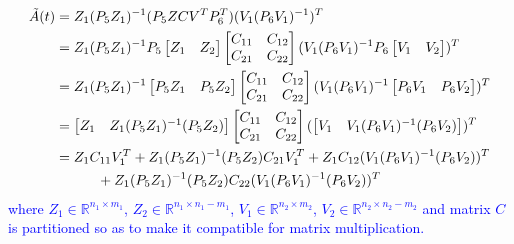 \documentclass{article}
\begin{document}
\textcolor{blue}{
\begin{equation}\label{eq41116}
\begin{split}
    \Tilde{A}(t)&=Z_1(P_5Z_1)^{-1}(P_5ZCV^TP_6^T)(V_1(P_6V_1)^{-1})^T\\
                &= Z_1(P_5Z_1)^{-1}P_5 \begin{bmatrix}
                    Z_1 & Z_2
                \end{bmatrix}\begin{bmatrix}
                    C_{11} & C_{12}\\
                    C_{21} & C_{22}
                \end{bmatrix}(V_1 (P_6V_1)^{-1} P_6\begin{bmatrix}
                    V_1 & V_2
                \end{bmatrix})^T\\
                &= Z_1(P_5Z_1)^{-1} \begin{bmatrix}
                    P_5Z_1 & P_5Z_2
                \end{bmatrix}\begin{bmatrix}
                    C_{11} & C_{12}\\
                    C_{21} & C_{22}
                \end{bmatrix}(V_1 (P_6V_1)^{-1} \begin{bmatrix}
                    P_6V_1 & P_6V_2
                \end{bmatrix})^T\\
                &=  \begin{bmatrix}
                    Z_1 & Z_1(P_5Z_1)^{-1}(P_5Z_2)
                \end{bmatrix}\begin{bmatrix}
                    C_{11} & C_{12}\\
                    C_{21} & C_{22}
                \end{bmatrix}( \begin{bmatrix}
                    V_1  & V_1 (P_6V_1)^{-1}(P_6V_2)
                \end{bmatrix})^T\\
                &= Z_1C_{11}V_1^T +  Z_1(P_5Z_1)^{-1}(P_5Z_2)C_{21}V_1^T +  Z_1 C_{12}(V_1 (P_6V_1)^{-1}(P_6V_2))^T \\
                & \quad \quad \quad + Z_1(P_5Z_1)^{-1}(P_5Z_2)C_{22}(V_1 (P_6V_1)^{-1}(P_6V_2))^T
\end{split}    
\end{equation}
where $Z_1 \in \mathbb{R}^{n_1 \times m_1}$, $Z_2 \in \mathbb{R}^{n_1 \times n_1-m_1}$, $V_1 \in \mathbb{R}^{n_2 \times m_2}$, $V_2 \in \mathbb{R}^{n_2 \times n_2-m_2}$ and matrix $C$ is partitioned so as to make it compatible for matrix multiplication. } 
\end{document}
